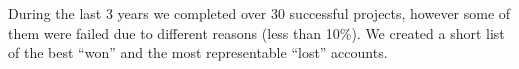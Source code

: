 
During the last 3 years we completed over 30 successful projects,
however some of them were failed due to different reasons (less than 10\%).
We created a short list of the best ``won'' and the most representable ``lost'' 
accounts.
